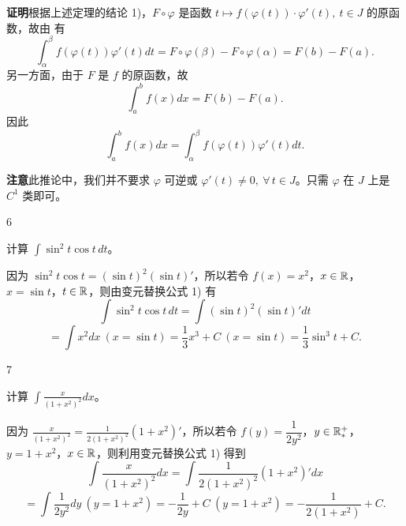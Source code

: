 \textbf{证明}\quad 根据上述定理的结论 1)，\(F\circ\varphi\) 是函数 \(t\longmapsto f(\varphi(t))\cdot\varphi'(t),\ t\in J\) 的原函数，故由 有
\[
\int_\alpha^\beta f(\varphi(t))\varphi'(t)dt=F\circ\varphi(\beta)-F\circ\varphi(\alpha)=F(b)-F(a).
\]
另一方面，由于 \(F\) 是 \(f\) 的原函数，故
\[
\int_a^b f(x)dx=F(b)-F(a).
\]
因此
\[
\int_a^b f(x)dx=\int_\alpha^\beta f(\varphi(t))\varphi'(t)dt.
\]

\textbf{注意}\quad 此推论中，我们并不要求 \(\varphi\) 可逆或 \(\varphi'(t)\neq0,\ \forall\,t\in J\)。只需 \(\varphi\) 在 \(J\) 上是 \(C^1\) 类即可。

\begin{sourceexample}{6}

	计算 \(\displaystyle\int\sin^2t\cos t\,dt\)。

	因为 \(\sin^2t\cos t=(\sin t)^2(\sin t)'\)，所以若令 \(f(x)=x^2\)，\(x\in\mathbb{R}\)，\(x=\sin t\)，\(t\in\mathbb{R}\)，则由变元替换公式 1) 有
	\[
	\int\sin^2t\cos t\,dt=\int(\sin t)^2(\sin t)'dt
	\]
	\[
	=\int x^2dx\ (x=\sin t)=\frac13x^3+C\ (x=\sin t)=\frac13\sin^3t+C.
	\]

\end{sourceexample}

\begin{sourceexample}{7}

	计算 \(\displaystyle\int\frac{x}{(1+x^2)^2}dx\)。

	因为 \(\displaystyle\frac{x}{(1+x^2)^2}=\frac1{2(1+x^2)^2}(1+x^2)'\)，所以若令 \(f(y)=\dfrac1{2y^2}\)，\(y\in\mathbb{R}_*^+\)，\(y=1+x^2\)，\(x\in\mathbb{R}\)，则利用变元替换公式 1) 得到
	\[
	\int\frac{x}{(1+x^2)^2}dx=\int\frac1{2(1+x^2)^2}(1+x^2)'dx
	\]
	\[
	=\int\frac1{2y^2}dy\ (y=1+x^2)=-\frac1{2y}+C\ (y=1+x^2)=-\frac1{2(1+x^2)}+C.
	\]

\end{sourceexample}

